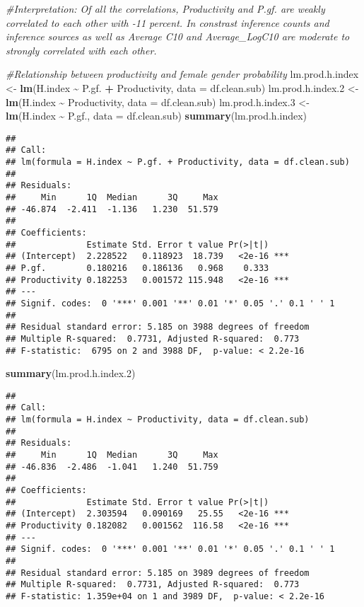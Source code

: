 \documentclass[
]{article}
\newenvironment{Shaded}{\begin{snugshade}}{\end{snugshade}}
\newcommand{\AttributeTok}[1]{\textcolor[rgb]{0.13,0.29,0.53}{#1}}
\newcommand{\CommentTok}[1]{\textcolor[rgb]{0.56,0.35,0.01}{\textit{#1}}}
\newcommand{\FloatTok}[1]{\textcolor[rgb]{0.00,0.00,0.81}{#1}}
\newcommand{\FunctionTok}[1]{\textcolor[rgb]{0.13,0.29,0.53}{\textbf{#1}}}
\newcommand{\NormalTok}[1]{#1}
\newcommand{\OtherTok}[1]{\textcolor[rgb]{0.56,0.35,0.01}{#1}}
\newcommand{\SpecialCharTok}[1]{\textcolor[rgb]{0.81,0.36,0.00}{\textbf{#1}}}
\begin{document}
\begin{Shaded}
\begin{Highlighting}[]
\CommentTok{\#Interpretation: Of all the correlations, Productivity and P.gf. are weakly correlated to each other with {-}11 percent. In constrast inference counts and inference sources as well as Average C10 and Average\_LogC10 are moderate to strongly correlated with each other.}

\CommentTok{\#Relationship between productivity and female gender probability}
\NormalTok{lm.prod.h.index }\OtherTok{\textless{}{-}} \FunctionTok{lm}\NormalTok{(H.index }\SpecialCharTok{\textasciitilde{}}\NormalTok{ P.gf. }\SpecialCharTok{+}\NormalTok{ Productivity, }\AttributeTok{data =}\NormalTok{ df.clean.sub)}
\NormalTok{lm.prod.h.index}\FloatTok{.2} \OtherTok{\textless{}{-}} \FunctionTok{lm}\NormalTok{(H.index }\SpecialCharTok{\textasciitilde{}}\NormalTok{ Productivity, }\AttributeTok{data =}\NormalTok{ df.clean.sub)}
\NormalTok{lm.prod.h.index}\FloatTok{.3} \OtherTok{\textless{}{-}} \FunctionTok{lm}\NormalTok{(H.index }\SpecialCharTok{\textasciitilde{}}\NormalTok{ P.gf., }\AttributeTok{data =}\NormalTok{ df.clean.sub)}
\FunctionTok{summary}\NormalTok{(lm.prod.h.index)}
\end{Highlighting}
\end{Shaded}

\begin{verbatim}
## 
## Call:
## lm(formula = H.index ~ P.gf. + Productivity, data = df.clean.sub)
## 
## Residuals:
##     Min      1Q  Median      3Q     Max 
## -46.874  -2.411  -1.136   1.230  51.579 
## 
## Coefficients:
##              Estimate Std. Error t value Pr(>|t|)    
## (Intercept)  2.228522   0.118923  18.739   <2e-16 ***
## P.gf.        0.180216   0.186136   0.968    0.333    
## Productivity 0.182253   0.001572 115.948   <2e-16 ***
## ---
## Signif. codes:  0 '***' 0.001 '**' 0.01 '*' 0.05 '.' 0.1 ' ' 1
## 
## Residual standard error: 5.185 on 3988 degrees of freedom
## Multiple R-squared:  0.7731, Adjusted R-squared:  0.773 
## F-statistic:  6795 on 2 and 3988 DF,  p-value: < 2.2e-16
\end{verbatim}

\begin{Shaded}
\begin{Highlighting}[]
\FunctionTok{summary}\NormalTok{(lm.prod.h.index}\FloatTok{.2}\NormalTok{)}
\end{Highlighting}
\end{Shaded}

\begin{verbatim}
## 
## Call:
## lm(formula = H.index ~ Productivity, data = df.clean.sub)
## 
## Residuals:
##     Min      1Q  Median      3Q     Max 
## -46.836  -2.486  -1.041   1.240  51.759 
## 
## Coefficients:
##              Estimate Std. Error t value Pr(>|t|)    
## (Intercept)  2.303594   0.090169   25.55   <2e-16 ***
## Productivity 0.182082   0.001562  116.58   <2e-16 ***
## ---
## Signif. codes:  0 '***' 0.001 '**' 0.01 '*' 0.05 '.' 0.1 ' ' 1
## 
## Residual standard error: 5.185 on 3989 degrees of freedom
## Multiple R-squared:  0.7731, Adjusted R-squared:  0.773 
## F-statistic: 1.359e+04 on 1 and 3989 DF,  p-value: < 2.2e-16
\end{verbatim}
\end{document}
